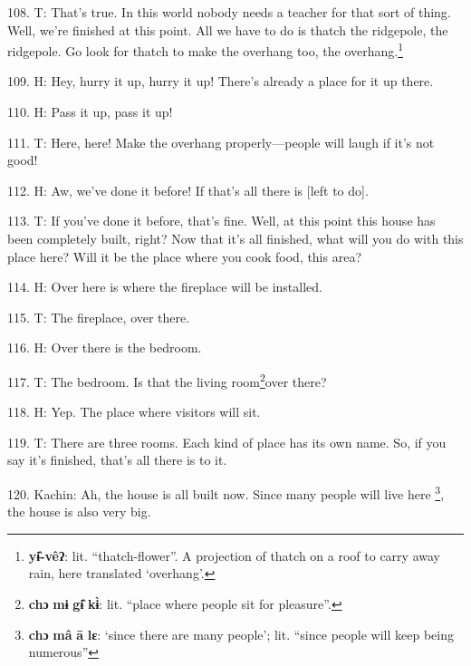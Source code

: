 108. T: That's true. In this world nobody needs a teacher for that sort of thing.
Well, we're finished at this point. All we have to do is thatch the ridgepole,
the ridgepole. Go look for thatch to make the overhang too, the overhang.\footnote{\textbf{yɨ̂-vêʔ}: lit. ``thatch-flower''. A projection of thatch on a roof to carry away rain, here translated `overhang'.}

109. H: Hey, hurry it up, hurry it up! There's already a place for it up there.

110. H: Pass it up, pass it up!

111. T: Here, here! Make the overhang properly---people will laugh if it's not
good!

112. H: Aw, we've done it before! If that's all there is [left to do].

113. T: If you've done it before, that's fine. Well, at this point this house has
been completely built, right? Now that it's all finished, what will you do with
this place here? Will it be the place where you cook food, this area?

114. H: Over here is where the fireplace will be installed.

115. T: The fireplace, over there.

116. H: Over there is the bedroom.

117. T: The bedroom. Is that the living room\footnote{\textbf{chɔ} \textbf{mɨ} \textbf{gɨ̂} \textbf{kɨ̀}: lit. ``place where people sit for pleasure''.}over there?

118. H: Yep. The place where visitors will sit.

119. T: There are three rooms. Each kind of place has its own name. So, if you
say it's finished, that's all there is to it.

120. Kachin: Ah, the house is all built now. Since many people will live here
\footnote{\textbf{chɔ} \textbf{mâ} \textbf{ā} \textbf{lɛ}: `since there are many people'; lit. ``since people will keep being numerous''}, the house is also very big.

